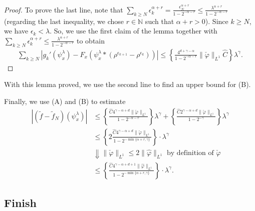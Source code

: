 \begin{itemize}
\begin{proof}
        To prove the last line, note that $\sum\limits_{k \geq N} \epsilon_k^{\alpha + r} = \frac{\epsilon_N^{\alpha+ r}}{1 - 2^{-\alpha - r}} \leq \frac{\lambda^{\alpha + r}}{1 - 2^{- \alpha - r}}$  (regarding the last inequality, we chose $r \in \mathbb{N}$ such that  $\alpha + r > 0$). Since $k \geq N$, we have $\epsilon_k < \lambda$. So, we use the first claim of the lemma together with $\sum\limits_{k \geq N} \epsilon_k^{\alpha + r} \leq \frac{\lambda^{\alpha + r}}{1 - 2^{- \alpha - r}}$ to obtain
        \begin{align*}
            \sum_{k \geq N} |g_k'(\psi^\lambda_x) - F_x(\psi^\lambda_x * (\rho^{\epsilon_{k+1}} - \rho^{\epsilon_k}))| \leq \left\{\frac{4^{d + \gamma - \alpha}}{1-2^{-\alpha - r}} \lVert \check \varphi \rVert_{L^1} \hat C \right\} \lambda^{\gamma}. 
        \end{align*} 
    \end{proof}
    With this lemma proved, we use the second line to find an upper bound for (B).
\end{itemize}

Finally, we use (A) and (B) to estimate
\begin{align*}
    |(\tilde f - \tilde f_N) (\psi^\lambda_x)| 
    &\leq
    \left \{ \frac{\hat C 4^{\gamma - \alpha + d} \lVert \check \varphi \rVert_{L^1} }{1-2^{-\alpha - r}} \right \} \lambda^{\gamma} + \left\{\frac{\hat C  2^{\gamma - \alpha + d} \lVert \check \varphi \rVert_{L^1}}{1-2^{-\gamma}}\right\} \lambda^{\gamma} \\
    &\leq \left\{ 2 \frac{\hat C 4^{\gamma - \alpha + d} \lVert \check \varphi \rVert_{L^1} }{1-2^{-\min\{\alpha + r, \gamma\}}} \right\}\cdot \lambda^{\gamma} \\
    &\Downarrow \text{$\lVert \check \varphi \rVert_{L^1} \leq 2\lVert \hat \varphi \rVert_{L^1} $ by definition of $\check \varphi$} \\
    &\leq \left\{ \frac{\hat C 4^{\gamma - \alpha + d + 1} \lVert \hat \varphi \rVert_{L^1} }{1-2^{-\min\{\alpha + r, \gamma\}}} \right\}\cdot \lambda^{\gamma}.
\end{align*}

\subsection*{Finish}

